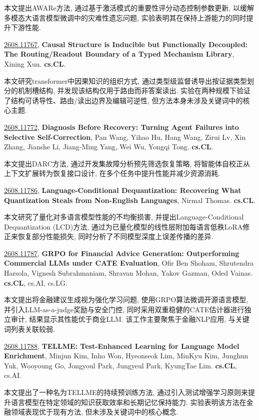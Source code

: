 \documentclass[9pt, a4paper]{article}
\theoremstyle{plain}
\theoremstyle{definition}
\theoremstyle{remark}
\newcommand{\arxivwithtarget}[3]{\hypertarget{#1}{}\href{https://arxiv.org/abs/#1}{#1}, \textbf{\textcolor{arxivblue}{#2}}, #3. }
\begin{document}
本文提出AWARe方法, 通过基于激活模式的重要性评分动态控制参数更新, 以缓解多模态大语言模型微调中的灾难性遗忘问题, 实验表明其在保持上游能力的同时提升下游性能.


\arxivwithtarget{2608.11767}{Causal Structure is Inducible but Functionally Decoupled: The Routing/Readout Boundary of a Typed Mechanism Library}{Xining Xun}\textbf{cs.CL}.

本文研究transformer中因果知识的组织方式, 通过类型级监督诱导出按证据类型划分的机制槽结构, 并发现该结构仅用于路由而非答案读出. 实验在两种规模下验证了结构可诱导性、路由/读出边界及编辑可逆性, 但方法本身未涉及关键词中的核心主题.


\arxivwithtarget{2608.11772}{Diagnosis Before Recovery: Turning Agent Failures into Selective Self-Correction}{Pan Wang, Yihao Hu, Hang Wang, Zirui Lv, Xin Zhang, Jianshe Li, Jiang-Ming Yang, Wei Wu, Yongqi Tong}\textbf{cs.CL}.

本文提出DARC方法, 通过开发集故障分析预先筛选恢复策略, 将智能体自校正从上下文扩展转为恢复接口设计, 在多个任务中提升性能并减少资源消耗.


\arxivwithtarget{2608.11786}{Language-Conditional Dequantization: Recovering What Quantization Steals from Non-English Languages}{Nirmal Thomas}\textbf{cs.CL}.

本文研究了量化对多语言模型性能的不均衡损害, 并提出Language-Conditional Dequantization (LCD)方法, 通过为已量化模型的线性层附加每语言低秩LoRA修正来恢复部分性能损失, 同时分析了不同模型深度上误差传播的差异.


\arxivwithtarget{2608.11787}{GRPO for Financial Advice Generation: Outperforming Commercial LLMs under CATE Evaluation}{Ofir Ben Shoham, Shrutendra Harsola, Vignesh Subrahmaniam, Shravan Mohan, Yakov Gazman, Oded Vainas}\textbf{cs.CL}, cs.AI, cs.LG.

本文提出将金融建议生成视为强化学习问题, 使用GRPO算法微调开源语言模型, 并引入LLM-as-a-judge奖励与安全门控, 同时采用双重稳健的CATE估计器进行独立审计, 结果显示其性能优于商业LLM. 该工作主要聚焦于金融NLP应用, 与关键词列表关联较弱.


\arxivwithtarget{2608.11788}{TELLME: Test-Enhanced Learning for Language Model Enrichment}{Minjun Kim, Inho Won, Hyeonseok Lim, MinKyu Kim, Junghun Yuk, Wooyoung Go, Jongyoul Park, Jungyeul Park, KyungTae Lim}\textbf{cs.CL}, cs.AI.

本文提出了一种名为TELLME的持续预训练方法, 通过引入测试增强学习原则来提升语言模型在特定领域的知识获取效率和长期记忆保持能力. 实验表明该方法在金融领域表现优于现有方法, 但未涉及关键词中的核心概念.
\end{document}
